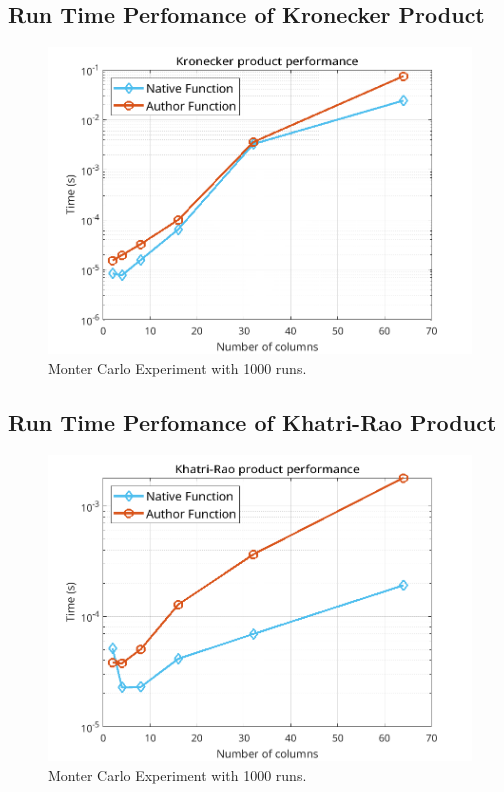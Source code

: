 \documentclass[a4paper,10pt]{article}
\begin{document}
    \subsection*{Run Time Perfomance of Kronecker Product}

    \begin{figure}[ht!]
        \centering 
        \includegraphics[width=0.75\linewidth]{figs/hw1a2.png} \par 
        \caption{Monter Carlo Experiment with 1000 runs.}
        \label{fig:hw1a2} 
    \end{figure}

    \subsection*{Run Time Perfomance of Khatri-Rao Product}

    \begin{figure}[ht!]
        \centering 
        \includegraphics[width=0.75\linewidth]{figs/hw1a3.png} \par 
        \caption{Monter Carlo Experiment with 1000 runs.}
        \label{fig:hw1a3} 
    \end{figure}
\end{document}
